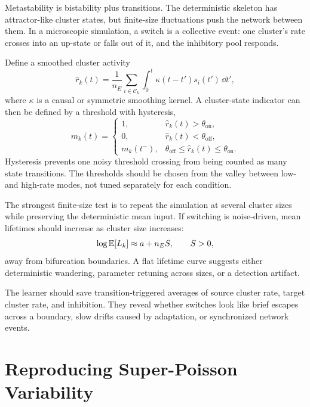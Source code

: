 Metastability is bistability plus transitions. The deterministic skeleton has attractor-like cluster states, but finite-size fluctuations push the network between them. In a microscopic simulation, a switch is a collective event: one cluster's rate crosses into an up-state or falls out of it, and the inhibitory pool responds.

Define a smoothed cluster activity
%
\begin{equation}
  \widehat r_k(t)
  =
  \frac{1}{n_E}
  \sum_{i\in\mathcal{C}_k}
  \int_0^t \kappa(t-t')s_i(t')\,\dd t',
  \label{eq:smoothed-cluster-activity-for-detection}
\end{equation}
%
where $\kappa$ is a causal or symmetric smoothing kernel. A cluster-state indicator can then be defined by a threshold with hysteresis,
%
\begin{equation}
  m_k(t)=
  \begin{cases}
    1, & \widehat r_k(t)>\theta_{\mathrm{on}},\\
    0, & \widehat r_k(t)<\theta_{\mathrm{off}},\\
    m_k(t^-), & \theta_{\mathrm{off}}\le \widehat r_k(t)\le \theta_{\mathrm{on}}.
  \end{cases}
  \label{eq:cluster-state-hysteresis}
\end{equation}
%
Hysteresis prevents one noisy threshold crossing from being counted as many state transitions. The thresholds should be chosen from the valley between low- and high-rate modes, not tuned separately for each condition.

The strongest finite-size test is to repeat the simulation at several cluster sizes while preserving the deterministic mean input. If switching is noise-driven, mean lifetimes should increase as cluster size increases:
%
\begin{equation}
  \log \mathbb{E}[L_k]
  \approx
  a + n_E S,
  \qquad
  S>0,
  \label{eq:lifetime-size-check}
\end{equation}
%
away from bifurcation boundaries. A flat lifetime curve suggests either deterministic wandering, parameter retuning across sizes, or a detection artifact.

The learner should save transition-triggered averages of source cluster rate, target cluster rate, and inhibition. They reveal whether switches look like brief escapes across a boundary, slow drifts caused by adaptation, or synchronized network events.

\section{Reproducing Super-Poisson Variability}
\label{sec:reproducing-super-poisson-variability}

